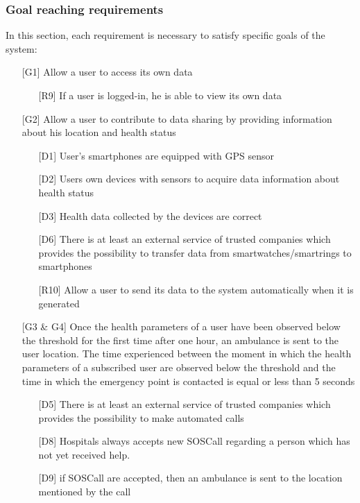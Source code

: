 \subsubsection{Goal reaching requirements}
\par
In this section, each requirement is necessary to satisfy specific goals of the system:
\begin{itemize}
\item[{[G1]}] Allow a user to access its own data
	\begin{itemize}
	\item[{[R9]}] If a user is logged-in, he is able to view its own data
	\end{itemize}
\item[{[G2]}] Allow a user to contribute to data sharing by providing information about his location and health status
	\begin{itemize}
	\item[{[D1]}]  User's smartphones are equipped with GPS sensor
	\item[{[D2]}] Users own devices with sensors to acquire data information about health status
	\item[{[D3]}] Health data collected by the devices are correct
	\item[{[D6]}] There is at least an external service of trusted companies which provides the possibility to transfer data from smartwatches/smartrings to smartphones
	\item[{[R10]}] Allow a user to send its data to the system automatically when it is generated
	\end{itemize}
\item[{[G3 \& G4]}] Once the health parameters of a user have been observed 
below the threshold for the first time after one hour, an ambulance is sent to the user location. 
The time experienced between the moment in which the health parameters of a subscribed user are observed below the threshold and the time in which the emergency point is contacted is equal or less than 5 seconds
	\begin{itemize}
	\item[{[D5]}] There is at least an external service of trusted companies which provides the possibility to make automated calls
	\item[{[D8]}] Hospitals always accepts new SOSCall regarding a person which has not yet received help.
	\item[{[D9]}] if SOSCall are accepted, then an ambulance is sent to the location mentioned by the call

\end{itemize}
\end{itemize}
